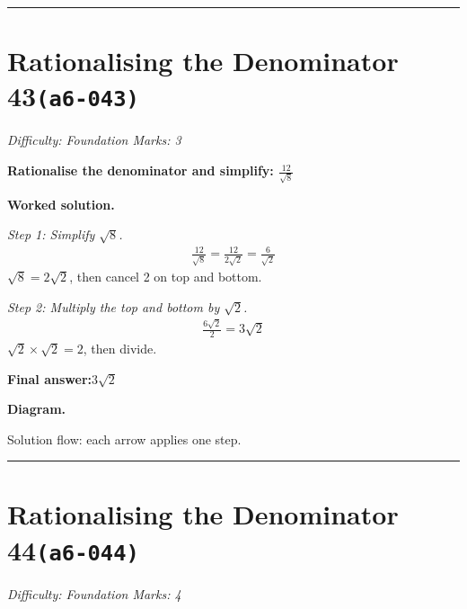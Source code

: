 \documentclass[11pt]{article}
\newcommand{\question}[1]{\par\medskip\noindent\textbf{#1}\par}
\begin{document}
\medskip\hrule

\section*{Rationalising the Denominator 43\quad\small\texttt{(a6-043)}}
\textit{Difficulty: Foundation \quad\textbar\quad Marks: 3}

\question{Rationalise the denominator and simplify: \( \frac{12}{\sqrt{8}} \)}

\textbf{Worked solution.}

\textit{Step 1: Simplify \( \sqrt{8} \).}
\[\begin{gathered}
\frac{12}{\sqrt{8}} = \frac{12}{2\sqrt{2}} = \frac{6}{\sqrt{2}}
\end{gathered}\]
\( \sqrt{8} = 2\sqrt{2} \), then cancel 2 on top and bottom.

\textit{Step 2: Multiply the top and bottom by \( \sqrt{2} \).}
\[\begin{gathered}
\frac{6\sqrt{2}}{2} = 3\sqrt{2}
\end{gathered}\]
\( \sqrt{2} \times \sqrt{2} = 2 \), then divide.

\begin{answerbox}
\textbf{Final answer:}\quad \(\displaystyle 3\sqrt{2}\)
\end{answerbox}
\textbf{Diagram.}

\begin{center}
\end{center}
\small Solution flow: each arrow applies one step.\normalsize

\medskip\hrule

\section*{Rationalising the Denominator 44\quad\small\texttt{(a6-044)}}
\textit{Difficulty: Foundation \quad\textbar\quad Marks: 4}
\end{document}
